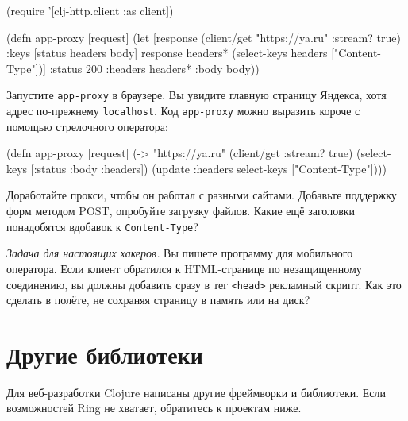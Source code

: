 \begin{english}
  \begin{clojure}
(require '[clj-http.client :as client])

(defn app-proxy [request]
  (let [response (client/get "https://ya.ru" {:stream? true})
        {:keys [status headers body]} response
        headers* (select-keys headers ["Content-Type"])]
    {:status 200
     :headers headers*
     :body body}))
  \end{clojure}
\end{english}

Запустите \verb|app-proxy| в браузере. Вы увидите главную страницу Яндекса,
хотя адрес по-прежнему \verb|localhost|. Код \verb|app-proxy| можно выразить
короче с помощью стрелочного оператора:

\begin{english}
  \begin{clojure}
(defn app-proxy [request]
  (-> "https://ya.ru"
      (client/get {:stream? true})
      (select-keys [:status :body :headers])
      (update :headers select-keys ["Content-Type"])))
  \end{clojure}
\end{english}

Доработайте прокси, чтобы он работал с разными сайтами. Добавьте поддержку форм
методом POST, опробуйте загрузку файлов. Какие ещё заголовки понадобятся
вдобавок к \verb|Content-Type|?

\emph{Задача для настоящих хакеров.} Вы пишете программу для мобильного
оператора. Если клиент обратился к HTML-странице по незащищенному соединению, вы
должны добавить сразу в тег \verb|<head>| рекламный скрипт. Как это сделать в
полёте, не сохраняя страницу в память или на диск?

\section{Другие библиотеки}

Для веб-разработки Clojure написаны другие фреймворки и библиотеки. Если
возможностей Ring не хватает, обратитесь к проектам ниже.

